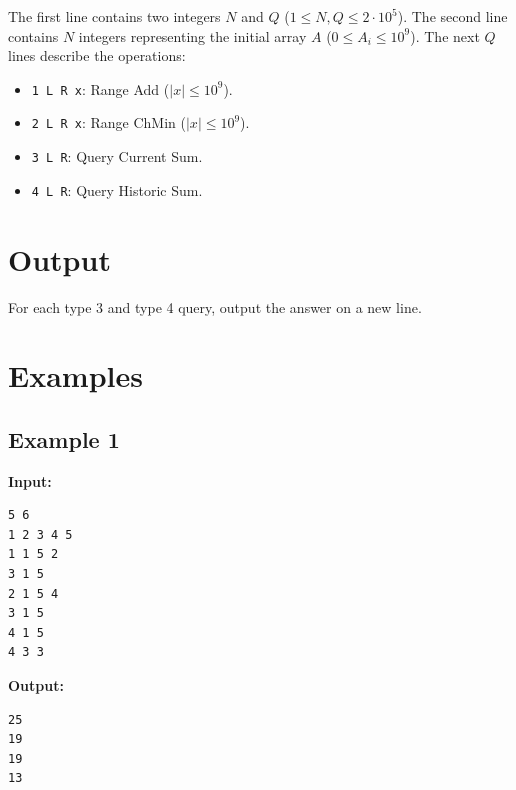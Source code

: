 \documentclass[11pt, letterpaper]{article}
\begin{document}
The first line contains two integers $N$ and $Q$ ($1 \le N, Q \le 2 \cdot 10^5$).
The second line contains $N$ integers representing the initial array $A$ ($0 \le A_i \le 10^9$).
The next $Q$ lines describe the operations:
\begin{itemize}
    \item \texttt{1 L R x}: Range Add ($|x| \le 10^9$).
    \item \texttt{2 L R x}: Range ChMin ($|x| \le 10^9$).
    \item \texttt{3 L R}: Query Current Sum.
    \item \texttt{4 L R}: Query Historic Sum.
\end{itemize}

\section*{Output}

For each type 3 and type 4 query, output the answer on a new line.

\section*{Examples}

\subsection*{Example 1}
\textbf{Input:}
\begin{verbatim}
5 6
1 2 3 4 5
1 1 5 2
3 1 5
2 1 5 4
3 1 5
4 1 5
4 3 3
\end{verbatim}

\textbf{Output:}
\begin{verbatim}
25
19
19
13
\end{verbatim}
\end{document}
